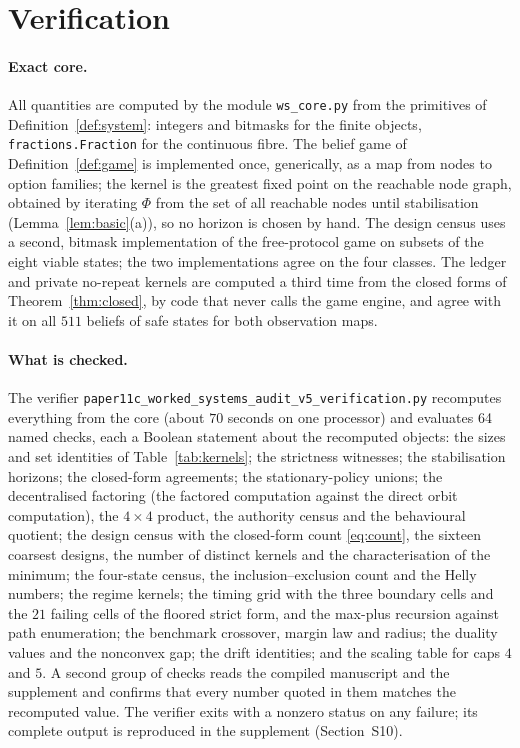 \documentclass[11pt,a4paper]{article}
\theoremstyle{plain}
\theoremstyle{definition}
\theoremstyle{remark}
\newcommand{\NCHECKS}{64}
\begin{document}
\section{Verification}\label{sec:verification}

\paragraph{Exact core.}
All quantities are computed by the module \texttt{ws\_core.py} from the primitives of Definition~\ref{def:system}: integers and bitmasks for the finite objects, \texttt{fractions.Fraction} for the continuous fibre. The belief game of Definition~\ref{def:game} is implemented once, generically, as a map from nodes to option families; the kernel is the greatest fixed point on the reachable node graph, obtained by iterating $\Phi$ from the set of all reachable nodes until stabilisation (Lemma~\ref{lem:basic}(a)), so no horizon is chosen by hand. The design census uses a second, bitmask implementation of the free-protocol game on subsets of the eight viable states; the two implementations agree on the four classes. The ledger and private no-repeat kernels are computed a third time from the closed forms of Theorem~\ref{thm:closed}, by code that never calls the game engine, and agree with it on all $511$ beliefs of safe states for both observation maps.

\paragraph{What is checked.}
The verifier \texttt{paper11c\_worked\_systems\_audit\_v5\_verification.py} recomputes everything from the core (about $70$ seconds on one processor) and evaluates \NCHECKS{} named checks, each a Boolean statement about the recomputed objects: the sizes and set identities of Table~\ref{tab:kernels}; the strictness witnesses; the stabilisation horizons; the closed-form agreements; the stationary-policy unions; the decentralised factoring (the factored computation against the direct orbit computation), the $4\times4$ product, the authority census and the behavioural quotient; the design census with the closed-form count \eqref{eq:count}, the sixteen coarsest designs, the number of distinct kernels and the characterisation of the minimum; the four-state census, the inclusion--exclusion count and the Helly numbers; the regime kernels; the timing grid with the three boundary cells and the $21$ failing cells of the floored strict form, and the max-plus recursion against path enumeration; the benchmark crossover, margin law and radius; the duality values and the nonconvex gap; the drift identities; and the scaling table for caps $4$ and $5$. A second group of checks reads the compiled manuscript and the supplement and confirms that every number quoted in them matches the recomputed value. The verifier exits with a nonzero status on any failure; its complete output is reproduced in the supplement (Section~S10).
\end{document}

